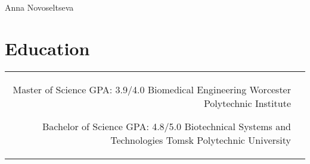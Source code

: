 \documentclass[10pt]{article} %
\begin{document}
\begin{paracol}{2} %


\parbox[top][0.06\textheight][c]{\linewidth}{ %
	\vspace{-0.04\textheight} %
	\centering %
	{\sffamily\Huge Anna Novoseltseva}\\\medskip %
}



\section{Education} 


\begin{supertabular}{rl} %

	{Master of Science} %
	{GPA: 3.9/4.0} %
	{Biomedical Engineering} %
	{Worcester Polytechnic Institute} %
	
	
	{Bachelor of Science} %
	{GPA: 4.8/5.0} %
	{Biotechnical Systems and Technologies} %
	{Tomsk Polytechnic University} %
	


\end{supertabular}
\end{paracol}
\end{document}
